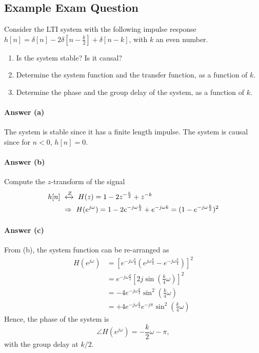 \subsection{Example Exam Question}
\begin{q}{}
    Consider the LTI system with the following impulse response $h[n]=\delta[n]-2\delta[n-\frac{k}{2}]+\delta[n-k]$, with $k$ an even number.
    \begin{enumerate}[label=(\alph*)]
        \item Is the system stable? Is it causal? 
        \item Determine the system function and the transfer function, as a function of $k$.
        \item Determine the phase and the group delay of the system, as a function of $k$.
    \end{enumerate}
    
    {\color{blue}
    \paragraph{Answer (a)}
    The system is stable since it has a finite length impulse. The system is causal since for $n<0$, $h[n] = 0$.
    
    \paragraph{Answer (b)}
    Compute the $z$-transform of the signal
    \begin{align*}
        h[n] \ & \xleftrightarrow[]{\mathcal{Z}} \ H(z) = 1 - 2z^{-\frac{k}{2}} + z^{-k} \\
        & \Rightarrow \ H(e^{j\omega}) = 1 - 2e^{-j\omega \frac{k}{2}} + e^{-j\omega k} = ( 1 - e^{-j\omega \frac{k}{2}} )^2 
    \end{align*}
    \color{blue}
    \paragraph{Answer (c)}
    From (b), the system function can be re-arranged as
    \begin{align*}
        H(e^{j\omega}) 
        &= [e^{-j\omega\frac{k}{4}} (e^{j\omega\frac{k}{4}} - e^{-j\omega\frac{k}{4}})]^2 \\
        & = e^{-j\omega\frac{k}{2}} \left[2j\sin \left(\frac{k}{4}\omega \right) \right]^2 \\
        & = -4e^{-j\omega\frac{k}{2}} \sin^2 \left(\frac{k}{4}\omega\right) \\
        & = +4e^{-j\omega\frac{k}{2}}e^{-j\pi} \sin^2 \left(\frac{k}{4}\omega\right)
    \end{align*}
    Hence, the phase of the system is
    \[
        \angle H(e^{j\omega}) = -\frac{k}{2} \omega - \pi,
    \]
    with the group delay at $k/2$.
    }
\end{q}





